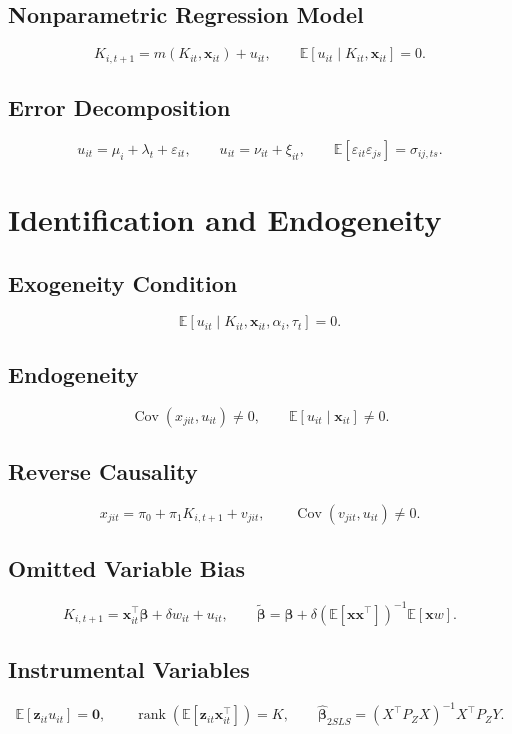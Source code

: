 \documentclass[11pt]{article}
\begin{document}
\subsection{Nonparametric Regression Model}
\[
K_{i,t+1}=m(K_{it},\bm{x}_{it})+u_{it},
\qquad \mathbb{E}[u_{it}\mid K_{it},\bm{x}_{it}]=0.
\]

\subsection{Error Decomposition}
\[
u_{it}=\mu_i+\lambda_t+\varepsilon_{it},
\qquad u_{it}=\nu_{it}+\xi_{it},
\qquad \mathbb{E}[\varepsilon_{it}\varepsilon_{js}]=\sigma_{ij,ts}.
\]

\section{Identification and Endogeneity}

\subsection{Exogeneity Condition}
\[
\mathbb{E}[u_{it}\mid K_{it},\bm{x}_{it},\alpha_i,\tau_t]=0.
\]

\subsection{Endogeneity}
\[
\operatorname{Cov}(x_{jit},u_{it})\neq 0,
\qquad \mathbb{E}[u_{it}\mid \bm{x}_{it}]\neq 0.
\]

\subsection{Reverse Causality}
\[
x_{jit}=\pi_0+\pi_1 K_{i,t+1}+v_{jit},
\qquad \operatorname{Cov}(v_{jit},u_{it})\neq 0.
\]

\subsection{Omitted Variable Bias}
\[
K_{i,t+1}=\bm{x}_{it}^\top\bm{\beta}+\delta w_{it}+u_{it},
\qquad \tilde{\bm{\beta}}=\bm{\beta}+\delta\left(\mathbb{E}[\bm{x}\bm{x}^\top]\right)^{-1}\mathbb{E}[\bm{x}w].
\]

\subsection{Instrumental Variables}
\[
\mathbb{E}[\bm{z}_{it}u_{it}]=\bm{0},
\qquad \operatorname{rank}(\mathbb{E}[\bm{z}_{it}\bm{x}_{it}^\top])=K,
\qquad \hat{\bm{\beta}}_{2SLS}=(X^\top P_Z X)^{-1}X^\top P_Z Y.
\]
\end{document}
